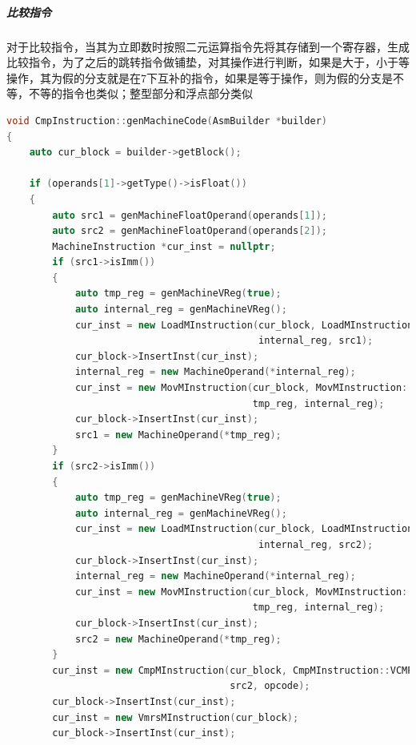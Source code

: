 \documentclass[UTF8,a4paper,10pt]{ctexart}
\begin{document}
\subparagraph{比较指令}
对于比较指令，当其为立即数时按照二元运算指令先将其存储到一个寄存器，生成比较指令，为了之后的跳转指令做铺垫，对其操作进行判断，如果是大于，小于等操作，其为假的分支就是在7下互补的指令，如果是等于操作，则为假的分支是不等，不等的指令也类似；整型部分和浮点部分类似
\begin{lstlisting}[title = 生成目标代码, language = c++]
void CmpInstruction::genMachineCode(AsmBuilder *builder)
{
    auto cur_block = builder->getBlock();

    if (operands[1]->getType()->isFloat())
    {
        auto src1 = genMachineFloatOperand(operands[1]);
        auto src2 = genMachineFloatOperand(operands[2]);
        MachineInstruction *cur_inst = nullptr;
        if (src1->isImm())
        {
            auto tmp_reg = genMachineVReg(true);
            auto internal_reg = genMachineVReg();
            cur_inst = new LoadMInstruction(cur_block, LoadMInstruction::LDR,
                                            internal_reg, src1);
            cur_block->InsertInst(cur_inst);
            internal_reg = new MachineOperand(*internal_reg);
            cur_inst = new MovMInstruction(cur_block, MovMInstruction::VMOV,
                                           tmp_reg, internal_reg);
            cur_block->InsertInst(cur_inst);
            src1 = new MachineOperand(*tmp_reg);
        }
        if (src2->isImm())
        {
            auto tmp_reg = genMachineVReg(true);
            auto internal_reg = genMachineVReg();
            cur_inst = new LoadMInstruction(cur_block, LoadMInstruction::LDR,
                                            internal_reg, src2);
            cur_block->InsertInst(cur_inst);
            internal_reg = new MachineOperand(*internal_reg);
            cur_inst = new MovMInstruction(cur_block, MovMInstruction::VMOV,
                                           tmp_reg, internal_reg);
            cur_block->InsertInst(cur_inst);
            src2 = new MachineOperand(*tmp_reg);
        }
        cur_inst = new CmpMInstruction(cur_block, CmpMInstruction::VCMP, src1,
                                       src2, opcode);
        cur_block->InsertInst(cur_inst);
        cur_inst = new VmrsMInstruction(cur_block);
        cur_block->InsertInst(cur_inst);


\end{lstlisting}
\end{document}
